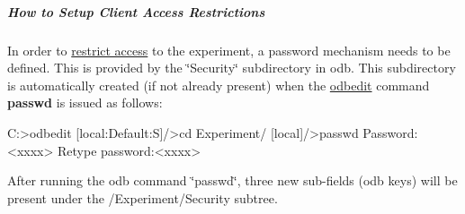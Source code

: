 \par


\par


\label{RC_customize_ODB_idx_ODB_tree_Experiment_Security}
\hypertarget{RC_customize_ODB_idx_ODB_tree_Experiment_Security}{}
\hypertarget{RC_customize_ODB_RC_Setup_Security}{}\subparagraph{How to Setup Client Access Restrictions}\label{RC_customize_ODB_RC_Setup_Security}
\label{RC_customize_ODB_idx_access-control_client}
\hypertarget{RC_customize_ODB_idx_access-control_client}{}
 In order to \hyperlink{RC_customize_ODB_RC_Access_Control}{restrict access} to the experiment, a password mechanism needs to be defined. This is provided by the \char`\"{}Security\char`\"{} subdirectory in odb. This subdirectory is automatically created (if not already present) when the \hyperlink{RC_odbedit_utility}{odbedit} command {\bfseries passwd} is issued as follows: 
\begin{DoxyCode}
  C:\online>odbedit
  [local:Default:S]/>cd Experiment/
  [local]/>passwd
  Password:<xxxx>
  Retype password:<xxxx>
\end{DoxyCode}
 After running the odb command \char`\"{}passwd\char`\"{}, three new sub-\/fields (odb keys) will be present under the /Experiment/Security subtree.

